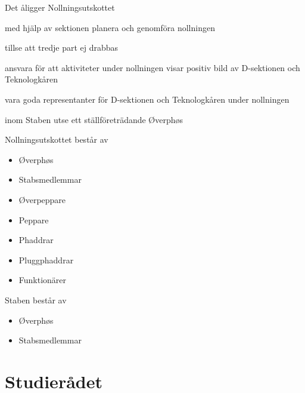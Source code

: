 \documentclass[pdfbookmarks,a4paper,11pt]{article}
\newlength{\itemcollength}
\newenvironment{reglemlista}{%
  \begin{list}{}{%
      \setlength{\labelwidth}{\itemcollength}%
      \setlength{\leftmargin}{\labelwidth + \labelsep}%
      \renewcommand{\makelabel}[1]{%
        \raisebox{0pt}[1ex][0pt]{%
          \makebox[\labelwidth][l]{%
            \parbox[t]{\itemcollength}{%
              \raggedright\hspace{0pt}##1}}}\hfill}%
      }}{%
  \end{list}}
\begin{document}
\begin{reglemlista}

	\item[Åligganden]
	Det åligger Nollningsutskottet
	\begin{attlista}
		\item med hjälp av sektionen planera och genomföra nollningen
		\item tillse att tredje part ej drabbas
		\item ansvara för att aktiviteter under nollningen visar positiv bild av D-sektionen och Teknologkåren
		\item vara goda representanter för D-sektionen och Teknologkåren under nollningen
		\item inom Staben utse ett ställföreträdande Øverphøs
	\end{attlista}

	\item[Sammansättning]
	Nollningsutskottet består av
	\begin{itemize}
		\item Øverphøs
		\item Stabsmedlemmar
		\item \O verpeppare
		\item Peppare
		\item Phaddrar
		\item Pluggphaddrar
        \item Funktionärer
	\end{itemize}

	\item[Staben]
	Staben består av
	\begin{itemize}
		\item Øverphøs
		\item Stabsmedlemmar
	\end{itemize}

\end{reglemlista}

\section{Studierådet}
\end{document}
